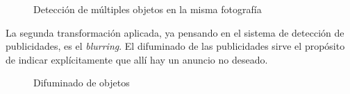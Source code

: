 \documentclass[a4paper]{article}
\begin{document}
\begin{figure}[H]
\caption{Detección de múltiples objetos en la misma fotografía}
\end{figure}

La segunda transformación aplicada, ya pensando en el sistema de detección de publicidades, es el \textit{blurring}. El difuminado de las publicidades sirve el propósito de indicar explícitamente que allí hay un anuncio no deseado.

\begin{figure}[H]
\caption{Difuminado de objetos}
\end{figure}
\end{document}
